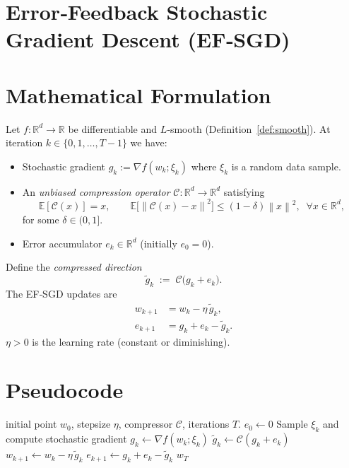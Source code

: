 \documentclass{article}
\newcommand{\E}{\mathbb{E}}
\newcommand{\norm}[1]{\left\|#1\right\|}
\begin{document}
\section*{Error‑Feedback Stochastic Gradient Descent (EF‑SGD)}

\section*{Mathematical Formulation}
Let $f:\mathbb{R}^d\to\mathbb{R}$ be differentiable and $L$‑smooth (Definition~\ref{def:smooth}).  
At iteration $k\in\{0,1,\dots,T-1\}$ we have:

\begin{itemize}
    \item Stochastic gradient $g_k:=\nabla f(w_k;\xi_k)$ where $\xi_k$ is a random data sample.
    \item An \emph{unbiased compression operator} $\mathcal{C}:\mathbb{R}^d\to\mathbb{R}^d$ satisfying  
    \begin{equation}
        \E[\mathcal{C}(x)]=x,\qquad 
        \E\!\big[\norm{\mathcal{C}(x)-x}^2\big]\le (1-\delta)\norm{x}^2,\;\; \forall x\in\mathbb{R}^d,
        \label{eq:compressor}
    \end{equation}
    for some $\delta\in(0,1]$.
    \item Error accumulator $e_k\in\mathbb{R}^d$ (initially $e_0=0$).
\end{itemize}
Define the \emph{compressed direction}
\[
\tilde g_k \;:=\; \mathcal{C}\!\big(g_k+e_k\big).
\]
The EF‑SGD updates are
\begin{align}
    w_{k+1} & = w_k - \eta\,\tilde g_k, \label{eq:update-w}\\
    e_{k+1} & = g_k+e_k-\tilde g_k . \label{eq:update-e}
\end{align}
$\eta>0$ is the learning rate (constant or diminishing).

\section*{Pseudocode}
\begin{algorithm}[H]
\caption{Error‑Feedback SGD}
\begin{algorithmic}[1]
 initial point $w_0$, stepsize $\eta$, compressor $\mathcal{C}$, iterations $T$.
\State $e_0\gets 0$
    \State Sample $\xi_k$ and compute stochastic gradient $g_k\gets \nabla f(w_k;\xi_k)$
    \State $\tilde g_k \gets \mathcal{C}(g_k+e_k)$   
    \State $w_{k+1}\gets w_k - \eta\,\tilde g_k$   
    \State $e_{k+1}\gets g_k+e_k-\tilde g_k$        
\EndFor
{} $w_T$
\end{algorithmic}
\end{algorithm}
\end{document}
